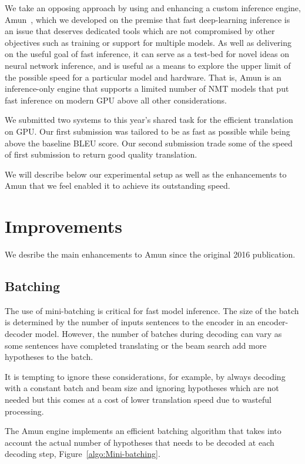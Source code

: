 \documentclass[11pt,a4paper]{article}
\begin{document}
We take an opposing approach by using and enhancing a custom inference engine, Amun~\citep{junczys2016neural}, which we developed on the premise that fast deep-learning inference is an issue that deserves dedicated tools which are not compromised by other objectives such as training or support for multiple models. As well as delivering on the useful goal of fast inference, it can serve as a test-bed for novel ideas on neural network inference, and is useful as a means to explore the upper limit of the possible speed for a particular model and hardware. That is, Amun is an inference-only engine that supports a limited number of NMT models that put fast inference on modern GPU above all other considerations. %

We submitted two systems to this year's shared task for the efficient translation on GPU. Our first submission was tailored to be as fast as possible while being above the baseline BLEU score. Our second submission trade some of the speed of first submission to return good quality translation.

We will describe below our experimental setup as well as the enhancements to Amun that we feel enabled it to achieve its outstanding speed.


\section{Improvements}

We desribe the main enhancements to Amun since the original 2016 publication.

\subsection{Batching}

The use of mini-batching is critical for fast model inference. The size of the batch is determined by the number of inputs sentences to the encoder in an encoder-decoder model. However, the number of batches during decoding can vary as some sentences have completed translating or the beam search add more hypotheses to the batch.

It is tempting to ignore these considerations, for example, by always decoding with a constant batch and beam size and ignoring hypotheses which are not needed but this comes at a cost of lower translation speed due to wasteful processing.

The Amun engine implements an efficient batching algorithm that takes into account the actual number of hypotheses that needs to be decoded at each decoding step, Figure~\ref{algo:Mini-batching}.
\end{document}
